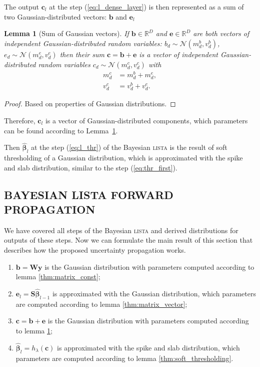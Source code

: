 \documentclass[letterpaper]{article}
\newtheorem{lemma}{Lemma}
\begin{document}
The output $\mathbf{c}_l$ at the step (\ref{eq:l_dense_layer}) is then represented as a sum of two Gaussian-distributed vectors: $\mathbf{b}$ and $\mathbf{e}_l$


\begin{lemma}[Sum of Gaussian vectors]
\label{thm:sum_vectors}
If $\mathbf{b} \in \mathbb{R}^{D}$ and $\mathbf{e} \in \mathbb{R}^{D}$ are both vectors of independent Gaussian-distributed random variables: $b_{d} \sim \mathcal{N}(m^b_{d}, v^b_{d})$, $e_{d} \sim \mathcal{N}(m^e_{d}, v^e_{d})$ then their sum $\mathbf{c} = \mathbf{b} + \mathbf{e}$ is a vector of independent Gaussian-distributed random variables $c_{d} \sim \mathcal{N}(m^c_{d}, v^c_{d})$ with 
\begin{subequations}
\begin{align}
m^c_{d} &= m^b_{d} + m^e_{d}, \\
v^c_{d} &= v^b_{d} + v^e_{d}.
 \end{align}
\end{subequations}
\end{lemma}
\begin{proof}
Based on properties of Gaussian distributions.
\end{proof}

Therefore, $\mathbf{c}_l$ is a vector of Gaussian-distributed components, which parameters can be found according to Lemma~\ref{thm:sum_vectors}.

Then $\widehat{\boldsymbol\beta}_{l}$ at the step (\ref{eq:l_thr}) of the Bayesian \textsc{lista} is the result of soft thresholding of a Gaussian distribution, which is approximated with the spike and slab distribution,  similar to the step (\ref{eq:thr_first}). 

\subsection{\uppercase{Bayesian lista forward propagation}}
We have covered all steps of the Bayesian \textsc{lista} and derived distributions for outputs of these steps. Now we can formulate the main result of this section that describes how the proposed uncertainty propagation works.

\begin{enumerate}
	\item $\mathbf{b} = \mathbf{W}\mathbf{y}$ is the Gaussian distribution with parameters computed according to lemma \ref{thm:matrix_const};
	\item $\mathbf{e}_l = \mathbf{S}\widehat{\boldsymbol\beta}_{l-1}$ is approximated with the Gaussian distribution, which parameters are computed according to lemma \ref{thm:matrix_vector};
	\item $\mathbf{c} = \mathbf{b} + \mathbf{e}$ is the Gaussian distribution with parameters computed according to lemma \ref{thm:sum_vectors};
	\item $\widehat{\boldsymbol\beta}_{l} = h_\lambda(\mathbf{c})$ is approximated with the spike and slab distribution, which parameters are computed according to lemma \ref{thm:soft_thresholding}.
\end{enumerate}
\end{document}
